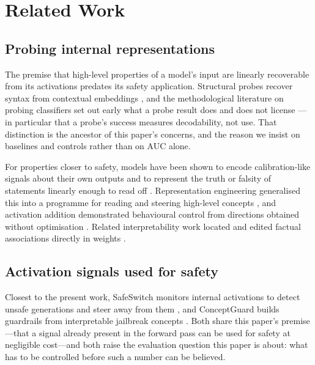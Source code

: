 \section{Related Work}
\label{sec:related}

\subsection{Probing internal representations}

The premise that high-level properties of a model's input are linearly recoverable from its activations predates its
safety application. Structural probes recover syntax from contextual embeddings \cite{hewitt2019structural}, and the
methodological literature on probing classifiers set out early what a probe result does and does not license
\cite{belinkov2022probing}---in particular that a probe's success measures decodability, not use. That distinction is
the ancestor of this paper's concerns, and the reason we insist on baselines and controls rather than on AUC alone.

For properties closer to safety, models have been shown to encode calibration-like signals about their own outputs
\cite{kadavath2022language} and to represent the truth or falsity of statements linearly enough to read off
\cite{azaria2023internal, marks2023geometry}. Representation engineering generalised this into a programme for reading
and steering high-level concepts \cite{zou2023representation}, and activation addition demonstrated behavioural
control from directions obtained without optimisation \cite{turner2023activation}. Related interpretability work
located and edited factual associations directly in weights \cite{meng2022locating}.

\subsection{Activation signals used for safety}

Closest to the present work, SafeSwitch monitors internal activations to detect unsafe generations and steer away from
them \cite{han2025safeswitch}, and ConceptGuard builds guardrails from interpretable jailbreak concepts
\cite{conceptguard2025}. Both share this paper's premise---that a signal already present in the forward pass can be
used for safety at negligible cost---and both raise the evaluation question this paper is about: what has to be
controlled before such a number can be believed.

